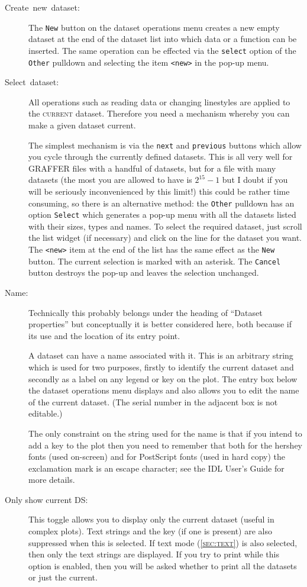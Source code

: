 \documentclass[11pt,twoside,english]{article}
\begin{document}
\begin{description}
\item [Create~new~dataset\label{make-new-ds}:]The \texttt{New} button
  on the dataset operations menu creates a new empty dataset at the end
  of the dataset list into which data or a function can be inserted.
  The same operation can be effected via the \texttt{select} option of
  the \texttt{Other} pulldown and selecting the item \texttt{<new>} in
  the pop-up menu.
\item [Select~dataset:]All operations such as reading data or changing
  linestyles are applied to the \textsc{current} dataset. Therefore you
  need a mechanism whereby you can make a given dataset current.


  The simplest mechanism is via the \texttt{next} and \texttt{previous}
  buttons which allow you cycle through the currently defined datasets.
  This is all very well for GRAFFER files with a handful of datasets,
  but for a file with many datasets (the most you are allowed to have
  is $2^{15}-1$ but I doubt if you will be seriously inconvenienced by
  this limit!) this could be rather time consuming, so there is an
  alternative method: the \texttt{Other} pulldown has an option
  \texttt{Select} which generates a pop-up menu with all the datasets
  listed with their sizes, types and names. To select the required
  dataset, just scroll the list widget (if necessary) and click on the
  line for the dataset you want. The \texttt{<new>} item at the end of
  the list has the same effect as the \texttt{New} button. The current
  selection is marked with an asterisk. The \texttt{Cancel} button
  destroys the pop-up and leaves the selection unchanged.

\item [Name:]Technically this probably belongs under the heading of
  {}``Dataset properties'' but conceptually it is better considered
  here, both because if its use and the location of its entry point.


  A dataset can have a name associated with it. This is an arbitrary
  string which is used for two purposes, firstly to identify the
  current dataset and secondly as a label on any legend or key on the
  plot.  The entry box below the dataset operations menu displays and
  also allows you to edit the name of the current dataset. (The serial
  number in the adjacent box is not editable.)

  The only constraint on the string used for the name is that if you
  intend to add a key to the plot then you need to remember that both
  for the hershey fonts (used on-screen) and for PostScript fonts (used
  in hard copy) the exclamation mark is an escape character; see the
  IDL User's Guide for more details.
\item[Only show current DS:] This toggle allows you to display only the
  current dataset (useful in complex plots). Text strings and the key
  (if one is present) are also suppressed when this is selected. If
  text mode (\textsc{\autoref{sec:text}}) is also selected, then only the
  text strings are displayed. If you try to print while this option is
  enabled, then you will be asked whether to print all the datasets or
  just the current.


\end{description}
\end{document}
